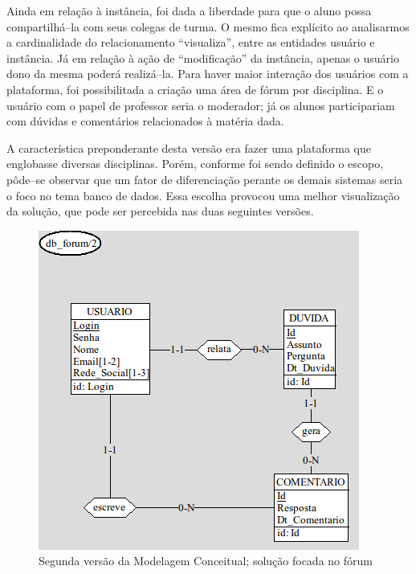 \documentclass[graduacao,brazil]{ThesisPUC}
\begin{document}
Ainda em rela\c{c}\~{a}o \`{a} inst\^{a}ncia, foi dada a liberdade para que o aluno possa compartilh\'{a}--la
com seus colegas de turma. O mesmo fica expl\'{i}cito ao analisarmos a cardinalidade do
relacionamento “visualiza”, entre as entidades usu\'{a}rio e inst\^{a}ncia. J\'{a} em rela\c{c}\~{a}o \`{a} a\c{c}\~{a}o de
“modifica\c{c}\~{a}o” da inst\^{a}ncia, apenas o usu\'{a}rio dono da mesma poder\'{a} realiz\'{a}--la.
Para haver maior intera\c{c}\~{a}o dos usu\'{a}rios com a plataforma, foi possibilitada a cria\c{c}\~{a}o uma
\'{a}rea de f\'{o}rum por disciplina. E o usu\'{a}rio com o papel de professor seria o moderador; j\'{a} os alunos
participariam com d\'{u}vidas e coment\'{a}rios relacionados \`{a} mat\'{e}ria dada.

A caracter\'{i}stica preponderante desta vers\~{a}o era fazer uma plataforma que englobasse
diversas disciplinas. Por\'{e}m, conforme foi sendo definido o escopo, p\^{o}de--se observar que um fator
de diferencia\c{c}\~{a}o perante os demais sistemas seria o foco no tema banco de dados. Essa escolha
provocou uma melhor visualiza\c{c}\~{a}o da solu\c{c}\~{a}o, que pode ser percebida nas duas seguintes
vers\~{o}es.

\begin{figure}[H]
    \centering
    \includegraphics[width=\linewidth]{Imagens/ModelagemConceitual_forum_v1_1.png}
    \caption{Segunda vers\~{a}o da Modelagem Conceitual; solu\c{c}\~{a}o focada no f\'{o}rum}
\end{figure}
\end{document}
